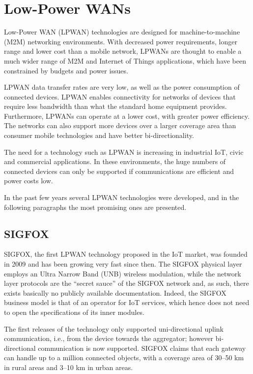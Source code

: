 \section{Low-Power WANs}

Low-Power WAN (LPWAN) technologies are designed for machine-to-machine (M2M) networking environments. With decreased power requirements, longer range and lower cost than a mobile network, LPWANs are thought to enable a much wider range of M2M and Internet of Things applications, which have been constrained by budgets and power issues.

LPWAN data transfer rates are very low, as well as the power consumption of connected devices. LPWAN enables connectivity for networks of devices that require less bandwidth than what the standard home equipment provides. Furthermore, LPWANs can operate at a lower cost, with greater power efficiency. The networks can also support more devices over a larger coverage area than consumer mobile technologies and have better bi-directionality.

The need for a technology such as LPWAN is increasing in industrial IoT, civic and commercial applications. In these environments, the huge numbers of connected devices can only be supported if communications are efficient and power costs low.

In the past few years several LPWAN technologies were developed, and in the following paragraphs the most promising ones are presented.

\subsection{SIGFOX}

SIGFOX, the first LPWAN technology proposed in the IoT market, was founded in 2009 and has been growing very fast since then. The SIGFOX physical layer employs an Ultra Narrow Band (UNB) wireless modulation, while the network layer protocols are the “secret sauce” of the SIGFOX network and, as such, there exists basically no publicly available documentation. Indeed, the SIGFOX business model is that of an operator for IoT services, which hence does not need to open the specifications of its inner modules.

The first releases of the technology only supported uni-directional uplink communication, i.e., from the device towards the aggregator; however bi-directional communication is now supported. SIGFOX claims that each gateway can handle up to a million connected objects, with a coverage area of 30–50 km in rural areas and 3–10 km in urban areas. \cite{centenaro}


